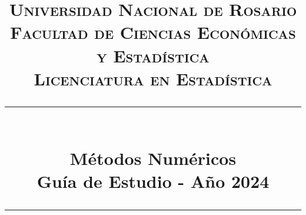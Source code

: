 \usepackage{booktabs}
\usepackage{multirow}

\usepackage[spanish]{babel}
\usepackage[utf8]{inputenc}


\usepackage{fancyhdr}
\pagestyle{fancy}
\renewcommand{\footrulewidth}{0.4pt}
\renewcommand{\sectionmark}[1]{\markright{#1}}
\fancyhead[R] {\leftmark}

\makeatletter
\renewcommand{\@chapapp}{Unidad}
\makeatother

\usepackage{etoolbox}
\patchcmd{\chapter}{\thispagestyle{plain}}{\thispagestyle{fancy}}{}{}


\usepackage{tocloft}
\renewcommand{\cftchapleader}{\cftdotfill{\cftdotsep}} %

\newcommand{\horrule}[1]{\rule{\linewidth}{#1}}
\title{
	\normalfont \normalsize
	\textsc{
		Universidad Nacional de Rosario \\
		Facultad de Ciencias Económicas y Estadística \\
		Licenciatura en Estadística
	} \\ [25pt]
	\horrule{2pt} \\[0.4cm]
	\huge \textbf{Métodos Numéricos} \\
	\bigbreak
	Guía de Estudio - Año 2024\\
	\horrule{2pt} \\[0.5cm]}

